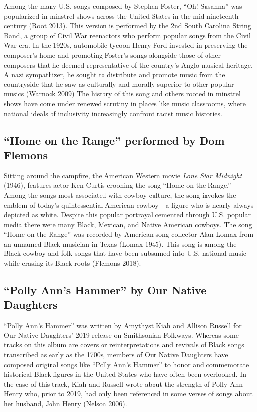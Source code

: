 \documentclass[twoside]{article}
\begin{document}
Among the many U.S. songs composed by Stephen Foster, ``Oh! Susanna''
was popularized in minstrel shows across the United States in the
mid-nineteenth century (Root 2013). This version is performed by the 2nd
South Carolina String Band, a group of Civil War reenactors who perform
popular songs from the Civil War era. In the 1920s, automobile tycoon
Henry Ford invested in preserving the composer's home and promoting
Foster's songs alongside those of other composers that he deemed
representative of the country's Anglo musical heritage. A nazi
sympathizer, he sought to distribute and promote music from the
countryside that he saw as culturally and morally superior to other
popular musics (Warnock 2009) The history of this song and others rooted
in minstrel shows have come under renewed scrutiny in places like music
classrooms, where national ideals of inclusivity increasingly confront
racist music histories.

\hypertarget{home-on-the-range-performed-by-dom-flemons}{%
\subsection*{``Home on the Range'' performed by Dom
Flemons}\label{home-on-the-range-performed-by-dom-flemons}}

Sitting around the campfire, the American Western movie \emph{Lone Star
Midnight} (1946), features actor Ken Curtis crooning the song ``Home on
the Range.'' Among the songs most associated with cowboy culture, the
song invokes the emblem of today's quintessential American cowboy---a
figure who is nearly always depicted as white. Despite this popular
portrayal cemented through U.S. popular media there were many Black,
Mexican, and Native American cowboys. The song ``Home on the Range'' was
recorded by American song collector Alan Lomax from an unnamed Black
musician in Texas (Lomax 1945). This song is among the Black cowboy and
folk songs that have been subsumed into U.S. national music while
erasing its Black roots (Flemons 2018).

\hypertarget{polly-anns-hammer-by-our-native-daughters}{%
\subsection*{``Polly Ann's Hammer'' by Our Native
Daughters}\label{polly-anns-hammer-by-our-native-daughters}}

``Polly Ann's Hammer'' was written by Amythyst Kiah and Allison Russell
for Our Native Daughters' 2019 release on Smithsonian Folkways. Whereas
some tracks on this album are covers or reinterpretations and revivals
of Black songs transcribed as early as the 1700s, members of Our Native
Daughters have composed original songs like ``Polly Ann's Hammer'' to
honor and commemorate historical Black figures in the United States who
have often been overlooked. In the case of this track, Kiah and Russell
wrote about the strength of Polly Ann Henry who, prior to 2019, had only
been referenced in some verses of songs about her husband, John Henry
(Nelson 2006).
\end{document}
